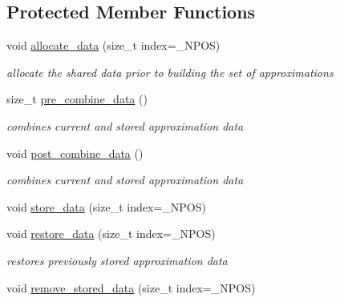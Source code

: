 \subsection*{Protected Member Functions}
\begin{DoxyCompactItemize}
\item 
void \hyperlink{classPecos_1_1SharedOrthogPolyApproxData_af8c5dd497976d775d2c600c9950f6b2e}{allocate\+\_\+data} (size\+\_\+t index=\+\_\+\+N\+P\+OS)\label{classPecos_1_1SharedOrthogPolyApproxData_af8c5dd497976d775d2c600c9950f6b2e}

\begin{DoxyCompactList}\small\item\em allocate the shared data prior to building the set of approximations \end{DoxyCompactList}\item 
size\+\_\+t \hyperlink{classPecos_1_1SharedOrthogPolyApproxData_a9eb4d06b29a49d454be12741309d8a2b}{pre\+\_\+combine\+\_\+data} ()\label{classPecos_1_1SharedOrthogPolyApproxData_a9eb4d06b29a49d454be12741309d8a2b}

\begin{DoxyCompactList}\small\item\em combines current and stored approximation data \end{DoxyCompactList}\item 
void \hyperlink{classPecos_1_1SharedOrthogPolyApproxData_a1fc086359221b123564e92c4ccee5a20}{post\+\_\+combine\+\_\+data} ()\label{classPecos_1_1SharedOrthogPolyApproxData_a1fc086359221b123564e92c4ccee5a20}

\begin{DoxyCompactList}\small\item\em combines current and stored approximation data \end{DoxyCompactList}\item 
void \hyperlink{classPecos_1_1SharedOrthogPolyApproxData_a3cc1fd74564bd6f83a59ac8ddc1fc264}{store\+\_\+data} (size\+\_\+t index=\+\_\+\+N\+P\+OS)
\item 
void \hyperlink{classPecos_1_1SharedOrthogPolyApproxData_a6e88613d26c8cf89c7d8365016ee67c2}{restore\+\_\+data} (size\+\_\+t index=\+\_\+\+N\+P\+OS)\label{classPecos_1_1SharedOrthogPolyApproxData_a6e88613d26c8cf89c7d8365016ee67c2}

\begin{DoxyCompactList}\small\item\em restores previously stored approximation data \end{DoxyCompactList}\item 
void \hyperlink{classPecos_1_1SharedOrthogPolyApproxData_ab48a802281615eb09255d0a8acd06987}{remove\+\_\+stored\+\_\+data} (size\+\_\+t index=\+\_\+\+N\+P\+OS)\label{classPecos_1_1SharedOrthogPolyApproxData_ab48a802281615eb09255d0a8acd06987}


\end{DoxyCompactItemize}
